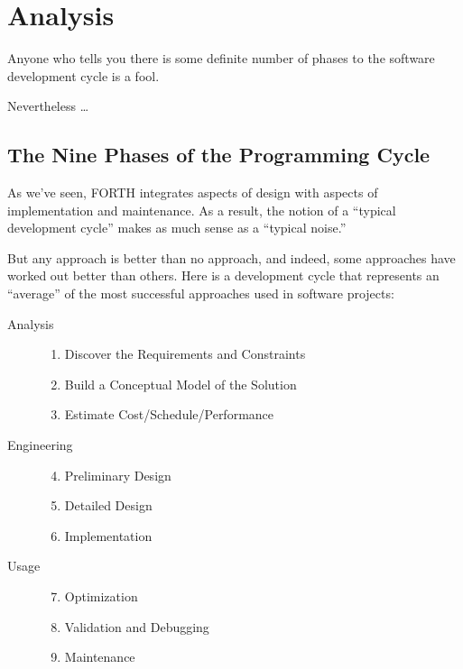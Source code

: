 

\chapter{Analysis}


Anyone who tells you there is some definite number of phases to the
software development cycle is a fool.

Nevertheless \dots{}

\section{The Nine Phases of the Programming Cycle}

As we've seen, FORTH integrates aspects of design with aspects of
implementation and maintenance. As a result, the notion of a ``typical
development cycle'' makes as much sense as a ``typical noise.''

But any approach is better than no approach, and indeed, some
approaches have worked out better than others. Here is a development
cycle that represents an ``average'' of the most successful approaches
used in software projects:

\begin{description}
\item[Analysis] \hfill
    \begin{enumerate}
    \item Discover the Requirements and Constraints
    \item Build a Conceptual Model of the Solution
    \item Estimate Cost/Schedule/Performance
    \end{enumerate}
\item[Engineering] \hfill
    \begin{enumerate}
    \setcounter{enumi}{3}
    \item Preliminary Design
    \item Detailed Design
    \item Implementation
    \end{enumerate}
\item[Usage] \hfill
    \begin{enumerate}
    \setcounter{enumi}{6}
    \item Optimization
    \item Validation and Debugging
    \item Maintenance
    \end{enumerate}
\end{description}

